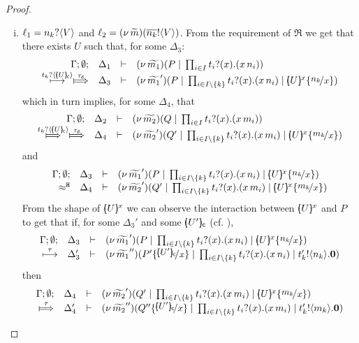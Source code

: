 \begin{proof}
\begin{enumerate}
\begin{enumerate}[i.]
					\item	$\ell_1 = n_k ? \langle V \rangle$ and $\ell_2 = (\nu\, \widetilde{m})(\overline{n_k} ! \langle V \rangle)$.
							From the requirement of $\Re$ we get that there exists $U$
							such that, for some $\Delta_3$:
							\[
								\mhorel{\Gamma}{\Delta_1}{ \newsp{\widetilde{m_1}}{P \Par \prod_{i \in I} \binp{t_i}{x} (\appl{x}{n_i})}}
								{ \hby{ \bactinp{t_k}{ \omapchar{U} }} \Hby{\dtau} }
								{\Delta_3}{}{  \newsp{\widetilde{m_1}'}{P \Par \prod_{i \in I\backslash{\set{k}}} \binp{t_i}{x} (\appl{x}{n_i})
								\Par  \mapchar{U}{x} \subst{n_k}{x} }}
							\]
							which in turn implies, for some $\Delta_4$, that
							\[
								\mhorel{\Gamma}{\Delta_2}{ \newsp{\widetilde{m_2}}{Q \Par \prod_{i \in I} \binp{t_i}{x} (\appl{x}{m_i})}}
								{ \Hby{ \bactinp{t_k}{ \omapchar{U} }} \Hby{\dtau} }
								{\Delta_4}{}{  \newsp{\widetilde{m_2}'}{Q' \Par \prod_{i \in I\backslash{\set{k}}} \binp{t_i}{x} (\appl{x}{m_i})
								\Par  \mapchar{U}{x} \subst{m_k}{x} }}
							\]
							and
							\[
								\mhorel{\Gamma}{\Delta_3}{  \newsp{\widetilde{m_1}'}{P \Par \prod_{i \in I\backslash{\set{k}}} \binp{t_i}{x} (\appl{x}{n_i})
								\Par  \mapchar{U}{x} \subst{n_k}{x} }}
								{\hwb}
								{\Delta_4}{}{  \newsp{\widetilde{m_2}'}{Q' \Par \prod_{i \in I\backslash{\set{k}}} \binp{t_i}{x} (\appl{x}{m_i})
								\Par  \mapchar{U}{x} \subst{m_k}{x} }}
							\]
							From the shape of $[\!\!(U)\!\!]^{x}$ we can observe the
							interaction between $[\!\!(U)\!\!]^{x}$ and $P$ to
							get that if, for some $\Delta_3'$ and some  $[\!\!(U')\!\!]_{\mathsf{c}}$ (cf. ), 
							\[
							\mhorel{\Gamma}{\Delta_3}{  \newsp{\widetilde{m_1}'}{P \Par \prod_{i \in I\backslash{\set{k}}} \binp{t_i}{x} (\appl{x}{n_i})
									\Par  \mapchar{U}{x} \subst{n_k}{x} }}
							{ \hby{\tau} }
							{\Delta_3'}{}{  \newsp{\widetilde{m_1}''}{P' \subst{\omapchar{U'}}{x} \Par \prod_{i \in I\backslash{\set{k}}} \binp{t_i}{x} (\appl{x}{n_i}) \Par
							\bout{t'_k}{n_k} \inact}}
							\]
							then
							\begin{eqnarray*}
								\mhorel{\Gamma}{\Delta_4}{  \newsp{\widetilde{m_2}'}{Q' \Par \prod_{i \in I\backslash{\set{k}}} \binp{t_i}{x} (\appl{x}{m_i})
										\Par  \mapchar{U}{x} \subst{m_k}{x} }}
								{ \Hby{\tau} }
								{\Delta_4'}{}{  \newsp{\widetilde{m_2}''}{Q'' \subst{\omapchar{U'}}{x} \Par \prod_{i \in I\backslash{\set{k}}} \binp{t_i}{x} (\appl{x}{m_i}) \Par
								\bout{t'_k}{m_k} \inact }}
							\end{eqnarray*}

\end{enumerate}
\end{enumerate}
\end{proof}
